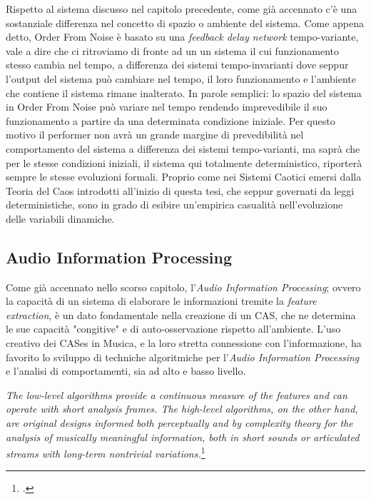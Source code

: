 Rispetto al sistema discusso nel capitolo precedente, 
come già accennato c'è una sostanziale differenza nel concetto di spazio
o ambiente del sistema. 
Come appena detto, Order From Noise è basato su una \textit{feedback delay network} 
tempo-variante, vale a dire che ci ritroviamo di fronte ad un un sistema il cui
funzionamento stesso cambia nel tempo, a differenza dei sistemi tempo-invarianti
dove seppur l'output del sistema può cambiare nel tempo, 
il loro funzionamento e l'ambiente che contiene il sistema rimane inalterato.
In parole semplici: lo spazio del sistema in Order From Noise può variare nel tempo
rendendo imprevedibile il suo funzionamento a partire da una determinata condizione 
iniziale.
Per questo motivo il performer non avrà un grande margine di prevedibilità 
nel comportamento del sistema a differenza dei sistemi tempo-varianti,
ma saprà che per le stesse condizioni iniziali, il sistema qui totalmente
deterministico, riporterà sempre le stesse evoluzioni formali.
Proprio come nei Sistemi Caotici emersi dalla Teoria del Caos introdotti all'inizio di questa tesi,
che seppur governati da leggi deterministiche, 
sono in grado di esibire un'empirica casualità nell'evoluzione delle variabili dinamiche. \\

\subsection{Audio Information Processing}
\label{sec:Audio Information Processing}
Come già accennato nello scorso capitolo, l'\textit{Audio Information Processing};
ovvero la capacità di un sistema di elaborare le informazioni
tremite la \textit{feature extraction}, è un dato fondamentale nella creazione 
di un CAS, che ne determina le sue capacità "congitive" e di auto-osservazione
rispetto all'ambiente. 
L'uso creativo dei CASes in Musica,
e la loro stretta connessione con l'informazione,
ha favorito lo sviluppo di techniche algoritmiche per l'\textit{Audio Information Processing} 
e l'analisi di comportamenti, sia ad alto e basso livello.

\begin{center}
    \vspace{0.5cm}
    \textit{The low-level algorithms provide a continuous measure of the features and can operate
with short analysis frames. The high-level algorithms, on the other hand, are original designs informed both perceptually
and by complexity theory for the analysis of musically meaningful information, both in short sounds or articulated
streams with long-term nontrivial variations.}\footcite{sanfilippo_time-domain_2021}
\vspace{0.5cm}
\end{center}


